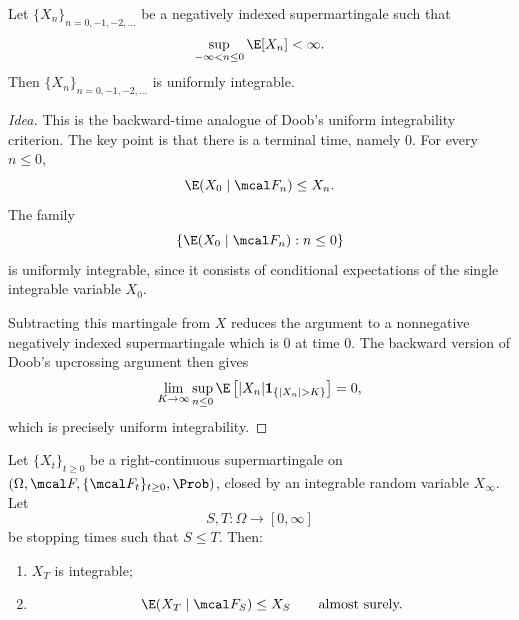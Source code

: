 \begin{theorem}
Let $\{X_n\}_{n=0,-1,-2,\ldots}$ be a negatively indexed
supermartingale such that
\[
    \sup_{-\infty<n\leq 0}\E[X_n]<\infty.
\]
Then $\{X_n\}_{n=0,-1,-2,\ldots}$ is uniformly integrable.
\end{theorem}

\begin{proof}[Idea]
This is the backward-time analogue of Doob's uniform integrability
criterion. The key point is that there is a terminal time, namely
$0$. For every $n\leq 0$,
\[
    \E(X_0\mid\mcal F_n)\leq X_n.
\]
The family
\[
    \left\{\E(X_0\mid\mcal F_n):n\leq 0\right\}
\]
is uniformly integrable, since it consists of conditional expectations
of the single integrable variable $X_0$.

Subtracting this martingale from $X$ reduces the argument to a
nonnegative negatively indexed supermartingale which is $0$ at time
$0$. The backward version of Doob's upcrossing argument then gives
\[
    \lim_{K\to\infty}
    \sup_{n\leq 0}
    \E\left[
        |X_n|\mathbf 1_{\{|X_n|>K\}}
    \right]
    =0,
\]
which is precisely uniform integrability.
\end{proof}

\begin{theorem}
Let $\{X_t\}_{t\geq 0}$ be a right-continuous supermartingale on
$(\Omega,\mcal F,\{\mcal F_t\}_{t\geq 0},\Prob)$, closed by an
integrable random variable $X_\infty$. Let
\[
    S,T:\Omega\to[0,\infty]
\]
be stopping times such that $S\leq T$. Then:

\begin{enumerate}
    \item[(i)] $X_T$ is integrable;

    \item[(ii)]
    \[
        \E(X_T\mid\mcal F_S)\leq X_S
        \qquad\text{almost surely.}
    \]
\end{enumerate}
\end{theorem}

